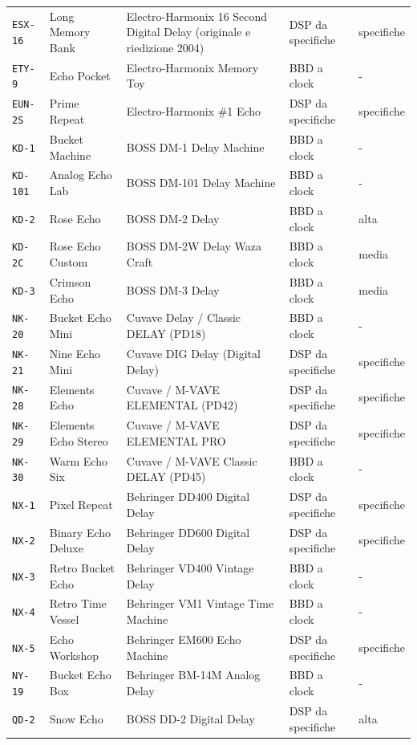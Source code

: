 \begin{xltabular}{\linewidth}{@{}l l X l l@{}}
\texttt{ESX-16} & Long Memory Bank & Electro-Harmonix 16 Second Digital Delay (originale e riedizione 2004) & DSP da specifiche & specifiche\\
\texttt{ETY-9} & Echo Pocket & Electro-Harmonix Memory Toy & BBD a clock & -\\
\texttt{EUN-2S} & Prime Repeat & Electro-Harmonix \#1 Echo & DSP da specifiche & specifiche\\
\texttt{KD-1} & Bucket Machine & BOSS DM-1 Delay Machine & BBD a clock & -\\
\texttt{KD-101} & Analog Echo Lab & BOSS DM-101 Delay Machine & BBD a clock & -\\
\texttt{KD-2} & Rose Echo & BOSS DM-2 Delay & BBD a clock & alta\\
\texttt{KD-2C} & Rose Echo Custom & BOSS DM-2W Delay Waza Craft & BBD a clock & media\\
\texttt{KD-3} & Crimson Echo & BOSS DM-3 Delay & BBD a clock & media\\
\texttt{NK-20} & Bucket Echo Mini & Cuvave Delay / Classic DELAY (PD18) & BBD a clock & -\\
\texttt{NK-21} & Nine Echo Mini & Cuvave DIG Delay (Digital Delay) & DSP da specifiche & specifiche\\
\texttt{NK-28} & Elements Echo & Cuvave / M-VAVE ELEMENTAL (PD42) & DSP da specifiche & specifiche\\
\texttt{NK-29} & Elements Echo Stereo & Cuvave / M-VAVE ELEMENTAL PRO & DSP da specifiche & specifiche\\
\texttt{NK-30} & Warm Echo Six & Cuvave / M-VAVE Classic DELAY (PD45) & BBD a clock & -\\
\texttt{NX-1} & Pixel Repeat & Behringer DD400 Digital Delay & DSP da specifiche & specifiche\\
\texttt{NX-2} & Binary Echo Deluxe & Behringer DD600 Digital Delay & DSP da specifiche & specifiche\\
\texttt{NX-3} & Retro Bucket Echo & Behringer VD400 Vintage Delay & BBD a clock & -\\
\texttt{NX-4} & Retro Time Vessel & Behringer VM1 Vintage Time Machine & BBD a clock & -\\
\texttt{NX-5} & Echo Workshop & Behringer EM600 Echo Machine & DSP da specifiche & specifiche\\
\texttt{NY-19} & Bucket Echo Box & Behringer BM-14M Analog Delay & BBD a clock & -\\
\texttt{QD-2} & Snow Echo & BOSS DD-2 Digital Delay & DSP da specifiche & alta\\

\end{xltabular}
